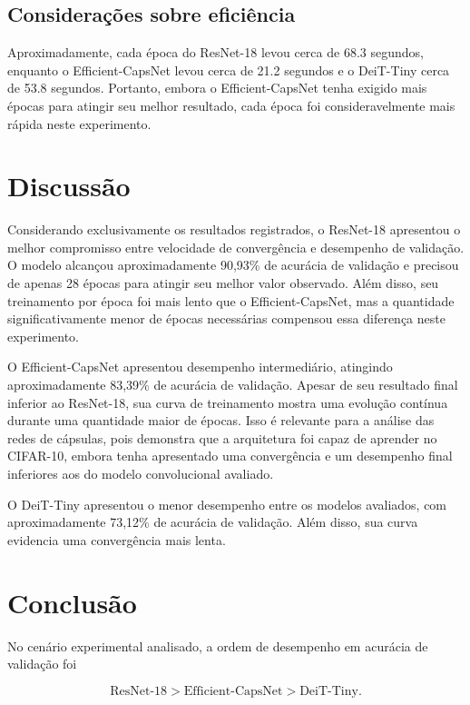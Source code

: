 \subsection{Considerações sobre eficiência}

Aproximadamente, cada época do ResNet-18 levou cerca de 68.3 segundos, enquanto o Efficient-CapsNet levou cerca de 21.2 segundos e o DeiT-Tiny cerca de 53.8 segundos. Portanto, embora o Efficient-CapsNet tenha exigido mais épocas para atingir seu melhor resultado, cada época foi consideravelmente mais rápida neste experimento.

\section{Discussão}

Considerando exclusivamente os resultados registrados, o ResNet-18 apresentou o melhor compromisso entre velocidade de convergência e desempenho de validação. O modelo alcançou aproximadamente 90,93\% de acurácia de validação e precisou de apenas 28 épocas para atingir seu melhor valor observado. Além disso, seu treinamento por época foi mais lento que o Efficient-CapsNet, mas a quantidade significativamente menor de épocas necessárias compensou essa diferença neste experimento.

O Efficient-CapsNet apresentou desempenho intermediário, atingindo aproximadamente 83,39\% de acurácia de validação. Apesar de seu resultado final inferior ao ResNet-18, sua curva de treinamento mostra uma evolução contínua durante uma quantidade maior de épocas. Isso é relevante para a análise das redes de cápsulas, pois demonstra que a arquitetura foi capaz de aprender no CIFAR-10, embora tenha apresentado uma convergência e um desempenho final inferiores aos do modelo convolucional avaliado.

O DeiT-Tiny apresentou o menor desempenho entre os modelos avaliados, com aproximadamente 73,12\% de acurácia de validação. Além disso, sua curva evidencia uma convergência mais lenta.

\section{Conclusão}

No cenário experimental analisado, a ordem de desempenho em acurácia de validação foi

\[
\text{ResNet-18} > \text{Efficient-CapsNet} > \text{DeiT-Tiny}.
\]

